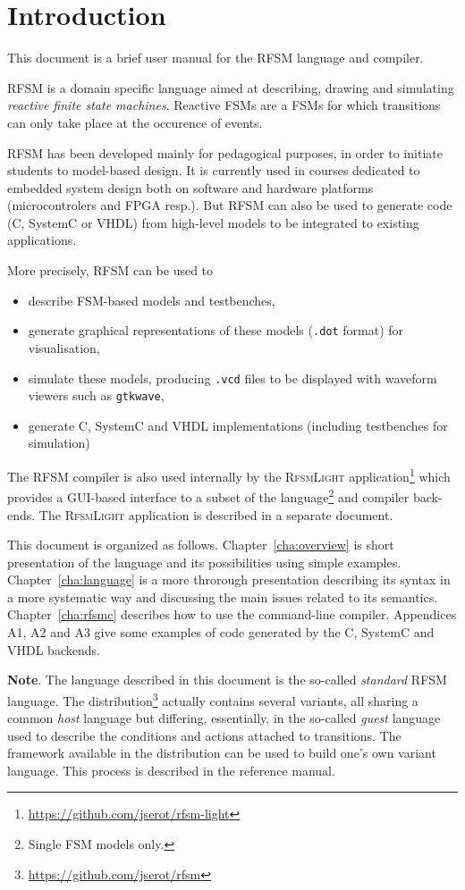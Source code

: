 \chapter{Introduction}
\label{chap:intro}

This document is a brief user manual for the RFSM language and compiler.

\medskip
RFSM is a domain specific language aimed at describing, drawing and simulating \emph{reactive finite state
  machines}. Reactive FSMs are a FSMs for which transitions can only take place at the occurence of
events.

\medskip
RFSM has been developed mainly for pedagogical purposes, in order to initiate students to
model-based design. It is currently used in courses dedicated to embedded system design both on
software and hardware platforms (microcontrolers and FPGA resp.). But RFSM can also be used to
generate code (C, SystemC or VHDL) from high-level models to be integrated to existing applications.

More precisely, RFSM can be used to
\begin{itemize}
\item describe FSM-based models and testbenches,
\item generate graphical representations of these models (\verb|.dot| format) for visualisation,
\item simulate these models, producing \verb|.vcd| files to be displayed with waveform viewers such
  as \texttt{gtkwave},
\item generate C, SystemC and VHDL implementations (including testbenches for simulation)
\end{itemize}

\medskip
The RFSM compiler is also used internally by the \textsc{RfsmLight}
application\footnote{\url{https://github.com/jserot/rfsm-light}} which provides a GUI-based interface to a
subset of the language\footnote{Single FSM models only.} and compiler back-ends. The
\textsc{RfsmLight} application is described in a separate document.

\medskip
This document is organized as follows.
Chapter~\ref{cha:overview} is short presentation of the language and its possibilities using simple
examples. Chapter~\ref{cha:language} is a more throrough presentation describing its syntax in a more
systematic way and discussing the main issues related to its semantics.
Chapter~\ref{cha:rfsmc} describes how to use the command-line compiler. Appendices
A1, A2 and A3 give some examples of code generated by the C, SystemC and VHDL backends.

\medskip
\textbf{Note}. The language described in this document is the so-called \emph{standard} RFSM language. The
distribution\footnote{\url{https://github.com/jserot/rfsm}} actually contains several variants, all
sharing a common \emph{host} language but differing, essentially, in the so-called \emph{guest} language used to describe
the conditions and actions attached to transitions. The framework available in the distribution
can be used to build one's own variant language. This process is described in the reference manual. 


